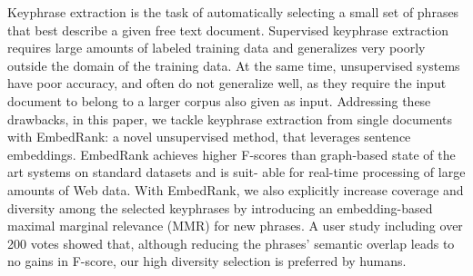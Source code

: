 Keyphrase extraction is the task of automatically selecting a small set of phrases that best describe a given free text document. Supervised keyphrase extraction requires large amounts of labeled training data and generalizes very poorly outside the domain of the training data. At the same time, unsupervised systems have poor accuracy, and often do not generalize well, as they require the input document to belong to a larger corpus also given as input. Addressing these drawbacks, in this paper, we tackle keyphrase extraction from single documents with EmbedRank: a novel unsupervised method, that leverages sentence embeddings. EmbedRank achieves higher F-scores than graph-based state of the art systems on standard datasets and is suit- able for real-time processing of large amounts of Web data. With EmbedRank, we also explicitly increase coverage and diversity among the selected keyphrases by introducing an embedding-based maximal marginal relevance (MMR) for new phrases. A user study including over 200 votes showed that, although reducing the phrases' semantic overlap leads to no gains in F-score, our high diversity selection is preferred by humans.
